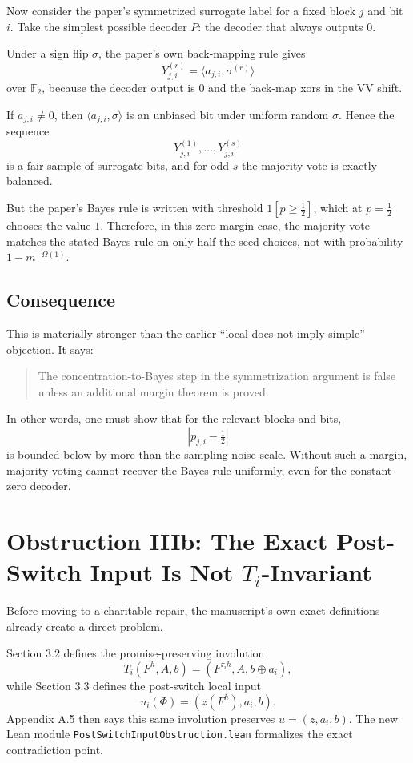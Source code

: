 \documentclass[11pt]{article}
\theoremstyle{remark}
\begin{document}
Now consider the paper's symmetrized surrogate label for a fixed block \(j\) and bit \(i\).  Take
the simplest possible decoder \(P\): the decoder that always outputs \(0\).

Under a sign flip \(\sigma\), the paper's own back-mapping rule gives
\[
  Y^{(r)}_{j,i} = \langle a_{j,i}, \sigma^{(r)} \rangle
\]
over \(\mathbb{F}_2\), because the decoder output is \(0\) and the back-map xors in the VV shift.

If \(a_{j,i} \neq 0\), then \(\langle a_{j,i}, \sigma \rangle\) is an unbiased bit under uniform random
\(\sigma\).  Hence the sequence
\[
  Y^{(1)}_{j,i}, \dots, Y^{(s)}_{j,i}
\]
is a fair sample of surrogate bits, and for odd \(s\) the majority vote is exactly balanced.

But the paper's Bayes rule is written with threshold \(1[p \ge \tfrac12]\), which at \(p=\tfrac12\)
chooses the value \(1\).  Therefore, in this zero-margin case, the majority vote matches the stated
Bayes rule on only half the seed choices, not with probability \(1 - m^{-\Omega(1)}\).

\subsection{Consequence}

This is materially stronger than the earlier ``local does not imply simple'' objection.  It says:

\begin{quote}
The concentration-to-Bayes step in the symmetrization argument is false unless an additional
margin theorem is proved.
\end{quote}

In other words, one must show that for the relevant blocks and bits,
\[
  \left| p_{j,i} - \tfrac12 \right|
\]
is bounded below by more than the sampling noise scale.  Without such a margin, majority voting
cannot recover the Bayes rule uniformly, even for the constant-zero decoder.

\section{Obstruction IIIb: The Exact Post-Switch Input Is Not \(T_i\)-Invariant}

Before moving to a charitable repair, the manuscript's own exact definitions already create a
direct problem.

Section 3.2 defines the promise-preserving involution
\[
  T_i(F^h, A, b) = (F^{\tau_i h}, A, b \oplus a_i),
\]
while Section 3.3 defines the post-switch local input
\[
  u_i(\Phi) = (z(F^h), a_i, b).
\]
Appendix A.5 then says this same involution preserves \(u=(z,a_i,b)\).  The new Lean module
\texttt{PostSwitchInputObstruction.lean} formalizes the exact contradiction point.
\end{document}
